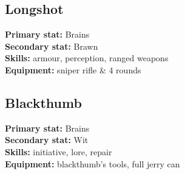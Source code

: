 \begin{multicols}{2}

\subsection{Longshot}
\textbf{Primary stat:} Brains\\
\textbf{Secondary stat:} Brawn\\
\textbf{Skills:} armour, perception, ranged weapons\\
\textbf{Equipment:} sniper rifle \& 4 rounds

\subsection{Blackthumb}
\textbf{Primary stat:} Brains\\
\textbf{Secondary stat:} Wit\\
\textbf{Skills:} initiative, lore, repair\\
\textbf{Equipment:} blackthumb's tools, full jerry can

\end{multicols}

\vspace*{-1em}
